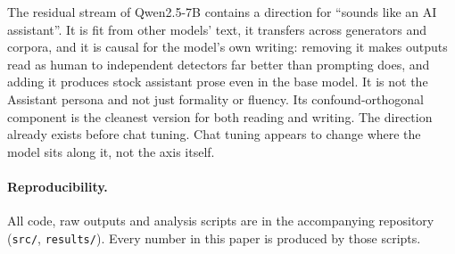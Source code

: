The residual stream of Qwen2.5-7B contains a direction for ``sounds like an AI assistant''. It is fit from other models' text, it transfers across generators and corpora, and it is causal for the model's own writing: removing it makes outputs read as human to independent detectors far better than prompting does, and adding it produces stock assistant prose even in the base model. It is not the Assistant persona and not just formality or fluency. Its confound-orthogonal component is the cleanest version for both reading and writing. The direction already exists before chat tuning. Chat tuning appears to change where the model sits along it, not the axis itself.

\paragraph{Reproducibility.} All code, raw outputs and analysis scripts are in the accompanying repository (\texttt{src/}, \texttt{results/}). Every number in this paper is produced by those scripts.
